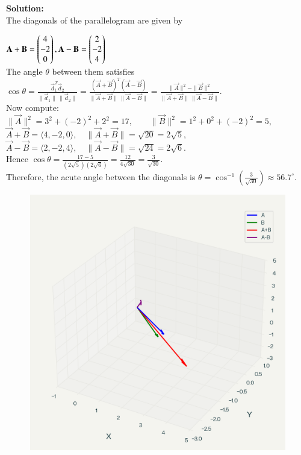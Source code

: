 \documentclass[journal]{IEEEtran}
\begin{document}
\textbf{Solution:}\\
The diagonals of the parallelogram are given by\\
\begin{center}
  $  \mathbf{A} + \mathbf{B} =
\begin{pmatrix}
4 \\
-2 \\
0
\end{pmatrix}
, \mathbf{A} - \mathbf{B} =
\begin{pmatrix}
2 \\
-2 \\
4
\end{pmatrix}
$\\

The angle $\theta$ between them satisfies
$
\cos\theta 
= \frac{\vec{d}_1 ^{T}\vec{d}_2}{\|\vec{d}_1\| \, \|\vec{d}_2\|}
= \frac{(\vec{A}+\vec{B})^{T}(\vec{A}-\vec{B})}{\|\vec{A}+\vec{B}\| \, \|\vec{A}-\vec{B}\|}
= \frac{\|\vec{A}\|^2 - \|\vec{B}\|^2}{\|\vec{A}+\vec{B}\| \, \|\vec{A}-\vec{B}\|}.
$\\
\vspace{0.3cm}
Now compute:
$
\|\vec{A}\|^2 = 3^2 + (-2)^2 + 2^2 = 17,
\qquad
\|\vec{B}\|^2 = 1^2 + 0^2 + (-2)^2 = 5,
$\\
\vspace{0.3cm}
$
\vec{A} + \vec{B} = \langle 4, -2, 0 \rangle, 
\quad \|\vec{A}+\vec{B}\| = \sqrt{20} = 2\sqrt{5},
$\\
\vspace{0.3cm}
$
\vec{A} - \vec{B} = \langle 2, -2, 4 \rangle, 
\quad \|\vec{A}-\vec{B}\| = \sqrt{24} = 2\sqrt{6}.
$\\
\vspace{0.3cm}
Hence
$
\cos\theta 
= \frac{17 - 5}{(2\sqrt{5})(2\sqrt{6})} 
= \frac{12}{4\sqrt{30}} 
= \frac{3}{\sqrt{30}}.
$\\

\vspace{0.3cm}
Therefore, the acute angle between the diagonals is
$
\theta = \cos^{-1}\!\left(\frac{3}{\sqrt{30}}\right) \approx 56.7^\circ.
$

\begin{figure}
    \centering
    \includegraphics[width=0.6\linewidth]{figs/parallelogram_diagonals.png}
    \caption{}
    \label{fig:placeholder}
\end{figure}








\end{center}
\end{document}
